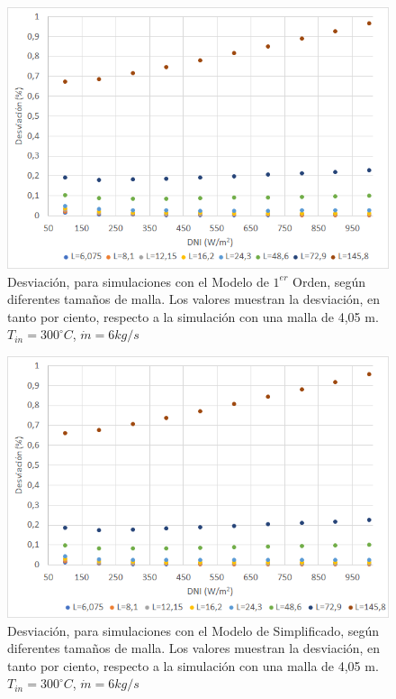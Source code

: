 \begin{figure}[H]
\includegraphics[width=0.9\linewidth]{images/desviacionmodel1malla.png}
\caption[Desviación, para simulaciones con el Modelo de $1^{er}$ Orden, según diferentes tamaños de malla]{Desviación, para simulaciones con el Modelo de $1^{er}$ Orden, según diferentes tamaños de malla. Los valores muestran la desviación, en tanto por ciento, respecto a la simulación con una malla de 4,05 m. $T_{in}=300 ^\circ C$, $\dot m = 6 kg/s$} 
\label{fig:desviacionmodel1}
\end{figure}

\begin{figure}[H]
\includegraphics[width=0.9\linewidth]{images/desviacionmodelsimplificadomalla.png}
\caption[Desviación, para simulaciones con el Modelo de Simplificado, según diferentes tamaños de malla]{Desviación, para simulaciones con el Modelo de Simplificado, según diferentes tamaños de malla. Los valores muestran la desviación, en tanto por ciento, respecto a la simulación con una malla de 4,05 m. $T_{in}=300 ^\circ C$, $\dot m = 6 kg/s$} 
\label{fig:desviacionmodelsimplificado}
\end{figure}


